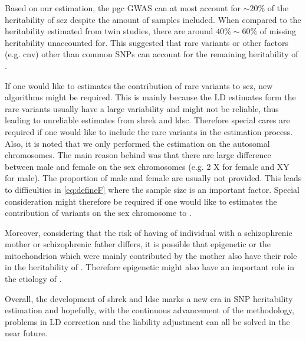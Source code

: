 \documentclass[12pt]{scrbook}
\newcommand*{\glng}{\glsentrylong}
\begin{document}
Based on our estimation, the \gls{pgc} \glng{scz} \gls{GWAS} can at most account for $\sim20\%$ of the heritability of \gls{scz} despite the amount of samples included.
When compared to the heritability estimated from twin studies, there are around $40\%\sim60\%$ of missing heritability unaccounted for. 
This suggested that rare variants or other factors (e.g. \gls{cnv}) other than common \glspl{SNP} can account for the remaining heritability of \glng{scz}.

If one would like to estimates the contribution of rare variants to \gls{scz}, new algorithms might be required. 
This is mainly because the \gls{LD} estimates form the rare variants usually have a large variability and might not be reliable, thus leading to unreliable estimates from \gls{shrek} and \gls{ldsc}.
Therefore special cares are required if one would like to include the rare variants in the estimation process.
Also, it is noted that we only performed the estimation on the autosomal chromosomes.
The main reason behind was that there are large difference between male and female on the sex chromosomes (e.g. 2 X for female and XY for male).
The proportion of male and female are usually not provided. 
This leads to difficulties in \cref{eq:defineF} where the sample size is an important factor.
Special consideration might therefore be required if one would like to estimates the contribution of variants on the sex chromosome to \glng{scz}.

Moreover, considering that the risk of having \glng{scz} of individual with a schizophrenic mother or schizophrenic father differs, it is possible that epigenetic or the mitochondrion which were mainly contributed by the mother also have their role in the heritability of \glng{scz}. 
Therefore epigenetic might also have an important role in the etiology of \glng{scz}.

Overall, the development of \gls{shrek} and \gls{ldsc} marks a new era in \gls{SNP} heritability estimation and hopefully, with the continuous advancement of the methodology, problems in \gls{LD} correction and the liability adjustment can all be solved in the near future.
\end{document}
